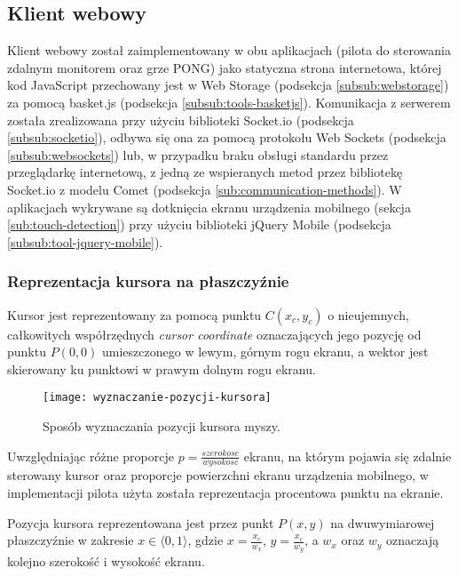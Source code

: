 \subsection{Klient webowy}
\label{subsub:impl-webclient}

Klient webowy został zaimplementowany w obu aplikacjach (pilota do sterowania zdalnym monitorem oraz grze PONG) jako statyczna strona internetowa, której kod JavaScript przechowany jest w Web Storage (podsekcja \ref{subsub:webstorage}) za pomocą basket.js (podsekcja \ref{subsub:tools-basketjs}). Komunikacja z serwerem została zrealizowana przy użyciu biblioteki Socket.io (podsekcja \ref{subsub:socketio}), odbywa się ona za pomocą protokołu Web Sockets (podsekcja \ref{subsub:websockets}) lub, w przypadku braku obsługi standardu przez przeglądarkę internetową, z jedną ze wspieranych metod przez bibliotekę Socket.io z modelu Comet (podsekcja \ref{sub:communication-methods}). W aplikacjach wykrywane są dotknięcia ekranu urządzenia mobilnego (sekcja \ref{sub:touch-detection}) przy użyciu biblioteki jQuery Mobile (podsekcja \ref{subsub:tool-jquery-mobile}).

\subsubsection{Reprezentacja kursora na płaszczyźnie}
\label{subsub:cursor-representation}

Kursor jest reprezentowany za pomocą punktu \(C(x_{c}, y_{c})\) o nieujemnych, całkowitych współrzędnych \emph{cursor coordinate} oznaczających jego pozycję od punktu \(P(0, 0)\) umieszczonego w lewym, górnym rogu ekranu, a wektor jest skierowany ku punktowi w prawym dolnym rogu ekranu.

\begin{figure}[h!]
  \caption{Sposób wyznaczania pozycji kursora myszy.}
  \centering
    \texttt{[image: wyznaczanie-pozycji-kursora]}
\end{figure}

Uwzględniając różne proporcje \(p = \frac{szerokosc}{wysokosc}\) ekranu, na którym pojawia się zdalnie sterowany kursor oraz proporcje powierzchni ekranu urządzenia mobilnego, w implementacji pilota użyta została reprezentacja procentowa punktu na ekranie.

Pozycja kursora reprezentowana jest przez punkt \(P(x, y)\) na dwuwymiarowej płaszczyźnie w zakresie \( x\in \langle0, 1\rangle \), gdzie \(x = \frac{x_{c}}{w_{x}}\), \(y = \frac{x_{c}}{w_{y}}\), a \(w_{x}\) oraz \(w_{y}\) oznaczają kolejno szerokość i wysokość ekranu.


